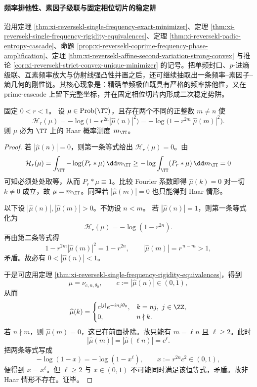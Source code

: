 \paragraph{频率排他性、素因子级联与固定相位切片的稳定阱}
沿用定理 \ref{thm:xi-reversekl-single-frequency-exact-minimizer}、定理 \ref{thm:xi-reversekl-single-frequency-rigidity-equivalences}、定理 \ref{thm:xi-reversekl-padic-entropy-cascade}、命题 \ref{prop:xi-reversekl-coprime-frequency-phase-amplification}、定理 \ref{thm:xi-reversekl-affine-second-variation-strong-convex} 与推论 \ref{cor:xi-reversekl-strict-convex-unique-minimizer} 的记号。把单频封口、\(p\)-进熵级联、互素频率放大与仿射线强凸性并置之后，还可继续抽取出一条频率--素因子--熵几何的刚性链。其核心现象是：精确单频极值既具有严格的频率排他性，又在 prime-cascade 上留下完整坐标，并在固定相位切片内形成二次稳定势阱。

\begin{theorem}[单频精确封口的频率排他性]\label{thm:conclusion-reversekl-single-frequency-exclusivity}
固定 \(0<r<1\)。
设 \(\mu\in \mathrm{Prob}(\TT)\)，且存在两个不同的正整数 \(m\neq n\) 使
\[
\mathcal H_r(\mu)
= -\log\!\bigl(1-r^{2n}|\widehat\mu(n)|^2\bigr)
= -\log\!\bigl(1-r^{2m}|\widehat\mu(m)|^2\bigr).
\]
则 \(\mu\) 必为 \(\TT\) 上的 Haar 概率测度 \(m_{\TT}\)。
\end{theorem}
\begin{proof}
若 \(|\widehat\mu(n)|=0\)，则第一条等式给出 \(\mathcal H_r(\mu)=0\)。由
\[
\mathcal H_r(\mu)=\int_{\TT}-\log(P_r*\mu)\,\dd m_{\TT}\ge -\log\int_{\TT}(P_r*\mu)\,\dd m_{\TT}=0
\]
可知必须处处取等，从而 \(P_r*\mu\equiv 1\)。比较 Fourier 系数即得 \(\widehat\mu(k)=0\) 对一切 \(k\neq 0\) 成立，故 \(\mu=m_{\TT}\)。同理若 \(|\widehat\mu(m)|=0\) 也只能得到 Haar 情形。

以下设 \(|\widehat\mu(n)|,|\widehat\mu(m)|>0\)。不妨设 \(n<m\)。
若 \(|\widehat\mu(n)|=1\)，则第一条等式化为
\[
\mathcal H_r(\mu)=-\log(1-r^{2n}).
\]
再由第二条等式得
\[
1-r^{2m}|\widehat\mu(m)|^2=1-r^{2n},
\qquad
|\widehat\mu(m)|=r^{\,n-m}>1,
\]
矛盾。故必有 \(0<|\widehat\mu(n)|<1\)。

于是可应用定理 \ref{thm:xi-reversekl-single-frequency-rigidity-equivalences}，得到
\[
\mu=\nu_{c,n,\theta_0},
\qquad
c:=|\widehat\mu(n)|\in(0,1),
\]
从而
\[
\widehat\mu(k)=
\begin{cases}
c^{|j|}e^{-inj\theta_0},& k=nj,\ j\in\ZZ,\\
0,& n\nmid k.
\end{cases}
\]
若 \(n\nmid m\)，则 \(\widehat\mu(m)=0\)，这已在前面排除。故只能有 \(m=\ell n\) 且 \(\ell\ge 2\)。此时
\[
|\widehat\mu(m)|=|\widehat\mu(\ell n)|=c^\ell.
\]
把两条等式写成
\[
-\log(1-x)=-\log(1-x^\ell),
\qquad
x:=r^{2n}c^2\in(0,1),
\]
便得到 \(x=x^\ell\)。但 \(\ell\ge 2\) 与 \(x\in(0,1)\) 不可能同时满足该恒等式，矛盾。故非 Haar 情形不存在。证毕。
\end{proof}

